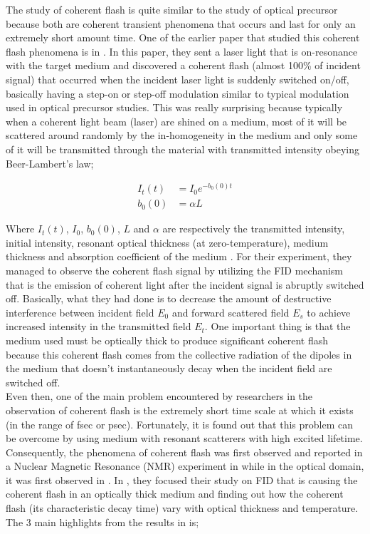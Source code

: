 The study of coherent flash is quite similar to the study of optical precursor because both are coherent transient phenomena that occurs and last for only an extremely short amount time. One of the earlier paper that studied this coherent flash phenomena is in \cite{Chalony2011}. In this paper, they sent a laser light that is on-resonance with the target medium and discovered a coherent flash (almost 100\% of incident signal) that occurred when the incident laser light is suddenly switched on/off, basically having a step-on or step-off modulation similar to typical modulation used in optical precursor studies. This was really surprising because typically when a coherent light beam (laser) are shined on a medium, most of it will be scattered around randomly by the in-homogeneity in the medium and only some of it will be transmitted through the material with transmitted intensity obeying Beer-Lambert's law;

\begin{align}
    I_{t}(t) &= I_{0} e^{-b_{0}(0)t}\\
    b_{0}(0) &= \alpha L
\end{align}

Where $I_{t}(t)$, $I_{0}$, $b_{0}(0)$, $L$ and $\alpha$ are respectively the transmitted intensity, initial intensity, resonant optical thickness (at zero-temperature), medium thickness and absorption coefficient of the medium \cite{Chalony2011}. For their experiment, they managed to observe the coherent flash signal by utilizing the FID mechanism that is the emission of coherent light after the incident signal is abruptly switched off. Basically, what they had done is to decrease the amount of destructive interference between incident field $E_0$ and forward scattered field $E_s$ to achieve increased intensity in the transmitted field $E_t$. One important thing is that the medium used must be optically thick to produce significant coherent flash because this coherent flash comes from the collective radiation of the dipoles in the medium that doesn't instantaneously decay when the incident field are switched off.\\

Even then, one of the main problem encountered by researchers in the observation of coherent flash is the extremely short time scale at which it exists (in the range of fsec or psec). Fortunately, it is found out that this problem can be overcome by using medium with resonant scatterers with high excited lifetime. Consequently, the phenomena of coherent flash was first observed and reported in a Nuclear Magnetic Resonance (NMR) experiment in \cite{Hahn1950} while in the optical domain, it was first observed in \cite{Brewer1972, Foster1974}. In \cite{Chalony2011}, they focused their study on FID that is causing the coherent flash in an optically thick medium and finding out how the coherent flash (its characteristic decay time) vary with optical thickness and temperature. The 3 main highlights from the results in \cite{Chalony2011} is;

